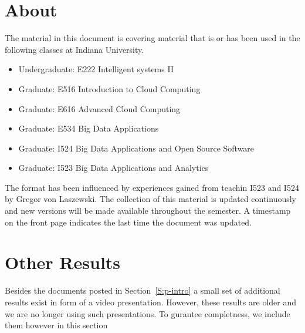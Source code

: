 \section{About}

The material in this document is covering material that is or has been
used in the following classes at Indiana University.

\begin{itemize}
\item Undergraduate: E222 Intelligent systems II
\item Graduate: E516 Introduction to Cloud Computing
\item Graduate: E616 Advanced Cloud Computing
\item Graduate: E534 Big Data Applications
\item Graduate: I524 Big Data Applications and Open Source Software
\item Graduate: I523 Big Data Applications and Analytics
\end{itemize}

The format has been influenced by experiences gained from teachin I523
and I524 by Gregor von Laszewski.  The collection of this material is
updated continuously and new versions will be made available
throughout the semester. A timestamp on the front page indicates the
last time the document was updated.

\section{Other Results}\label{S:results}

Besides the documents posted in Section~\ref{S:p-intro} a small set of
additional results exist in form of a video presentation.  However,
these results are older and we are no longer using such
presentations. To gurantee completness, we include them however in
this section








